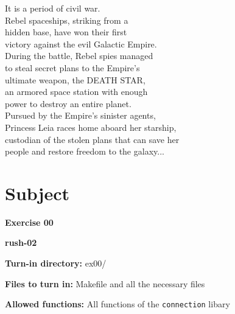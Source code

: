 \documentclass[12pt]{article}
\begin{document}
\begin{flushleft}
    It is a period of civil war.\\
    Rebel spaceships, striking from a\\
    hidden base, have won their first\\
    victory against the evil Galactic Empire.\\[1em]

    During the battle, Rebel spies managed\\
    to steal secret plans to the Empire's\\
    ultimate weapon, the DEATH STAR,\\
    an armored space station with enough\\
    power to destroy an entire planet.\\[1em]

    Pursued by the Empire's sinister agents,\\
    Princess Leia races home aboard her starship,\\
    custodian of the stolen plans that can save her\\
    people and restore freedom to the galaxy...
    \end{flushleft}

\newpage

\section{Subject}

\textbf{Exercise 00}

\textbf{rush-02}

\textbf{Turn-in directory:} ex00/

\textbf{Files to turn in:} Makefile and all the necessary files

\textbf{Allowed functions:} All functions of the \texttt{connection} libary
\end{document}
